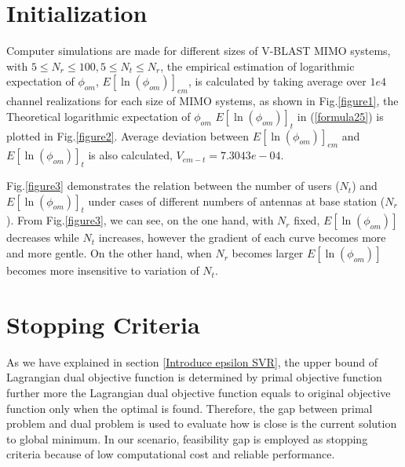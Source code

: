 \documentclass[12pt, draftclsnofoot, onecolumn]{IEEEtran}
\begin{document}
\section{Initialization}\label{Initialization}
 Computer simulations are made for different sizes of V-BLAST MIMO systems, with $5\leq N_{r} \leq 100, 5 \leq N_{t} \leq N_{r}$, the empirical estimation of logarithmic expectation of $\phi_{om}$, $E[\ln(\phi_{om})]_{em}$, is calculated by taking average over $1e4$ channel realizations for each size of MIMO systems, as shown in Fig.\ref{figure1}, the Theoretical logarithmic expectation of $\phi_{om}$ $E[\ln(\phi_{om})]_{t}$ in (\ref{formula25}) is plotted in Fig.\ref{figure2}. Average deviation between $E[\ln(\phi_{om})]_{em}$ and $E[\ln(\phi_{om})]_{t}$ is also calculated, $V_{em-t}= 7.3043e-04$.





Fig.\ref{figure3} demonstrates the relation between the number of users ($N_{t}$) and $E[\ln(\phi_{om})]_{t}$ under cases of different numbers of antennas at base station ($N_{r}$). From Fig.\ref{figure3}, we can see, on the one hand, with $N_{r}$ fixed, $E[\ln(\phi_{om})]$ decreases while $N_{t}$ increases, however the gradient of each curve becomes more and more gentle. On the other hand, when $N_{r}$ becomes larger $E[\ln(\phi_{om})]$ becomes more insensitive to variation of $N_{t}$.
\section{Stopping Criteria}\label{stopping criteria}
As we have explained in section \ref{Introduce epsilon SVR}, the upper bound of Lagrangian dual objective function is determined by primal objective function further more the Lagrangian dual objective function equals to original objective function only when the optimal is found. Therefore, the gap between primal problem and dual problem is used to evaluate how is close is the current solution to global minimum. In our scenario, feasibility gap is employed as stopping criteria because of low computational cost and reliable performance.
\end{document}
